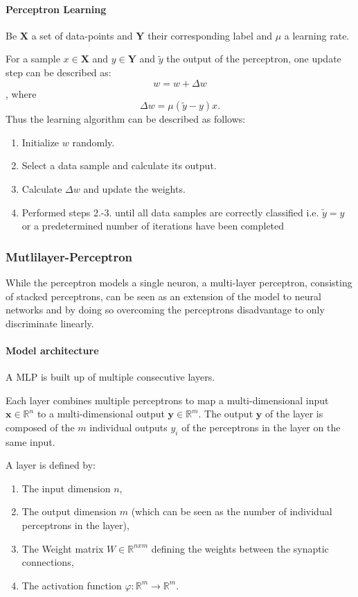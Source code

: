 \paragraph{Perceptron Learning}

Be $\textbf{X}$ a set of data-points and $\textbf{Y}$ their corresponding label and $\mu$ a learning rate. 

For a sample $x \in \textbf{X}$  and $y \in \textbf{Y}$ and $\tilde{y}$ the output of the perceptron, one update step can be described as:
\[ 
	w = w + \Delta w
\]
, where 
\[
	\Delta w = \mu (\tilde{y}-y) x .
\]
Thus the learning algorithm can be described as follows:

\begin{enumerate}
	\item Initialize $w$ randomly.
	\item Select a data sample and calculate its output.
	\item Calculate $\Delta w$ and update the weights.
	\item Performed steps 2.-3. until all data samples are correctly classified i.e. $\tilde{y} = y$ or a predetermined number of iterations have been completed
\end{enumerate}


\subsubsection{Mutlilayer-Perceptron}

While the perceptron models a single neuron, a multi-layer perceptron, consisting of stacked perceptrons, can be seen as an extension of the model to neural networks and by doing so overcoming the perceptrons disadvantage to only discriminate linearly. 

\paragraph{Model architecture}

A MLP is built up of multiple consecutive layers.

Each layer combines multiple perceptrons to map a multi-dimensional input $\textbf{x} \in \mathbb{R}^n$ to a multi-dimensional output $\textbf{y} \in \mathbb{R}^m$.
The output $\textbf{y}$ of the layer is composed of the $m$ individual outputs $y_i$ of the perceptrons in the layer on the same input.


A layer is defined by:
\begin{enumerate}
	\item The input dimension $n$,
	\item The output dimension $m$ (which can be seen as the number of individual perceptrons in the layer),
	\item The Weight matrix $W \in \mathbb{R}^{nxm} $ defining the weights between the synaptic connections,
	\item The activation function $\varphi : \mathbb{R}^m \rightarrow \mathbb{R}^m $.
\end{enumerate}

